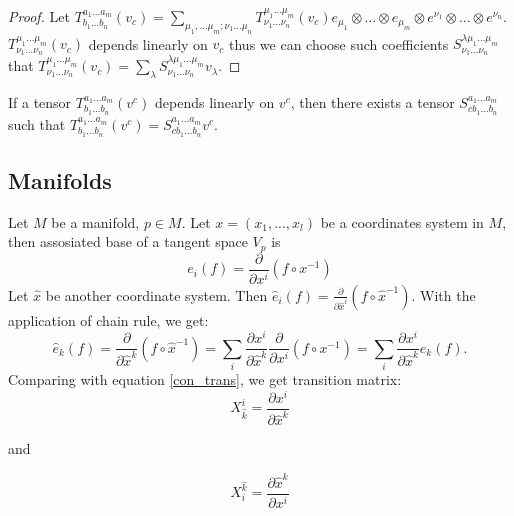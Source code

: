 \documentclass[main.tex]{subfiles}
\begin{document}
\begin{proof}
Let $T^{a_1\dots a_m}_{b_1\dots b_n}(v_c) = \sum\limits_{\mu_1,\dots\mu_m;\nu_1\dots\mu_n} T^{\mu_1\dots\mu_m}_{\nu_1\dots\nu_n}(v_c) e_{\mu_1} \otimes \dots \otimes e_{\mu_m} \otimes e^{\nu_1} \otimes \dots \otimes e^{\nu_n}$. $T^{\mu_1\dots\mu_m}_{\nu_1\dots\nu_n}(v_c)$ depends linearly on $v_c$ thus we can choose such coefficients 
$S^{\lambda \mu_1\dots\mu_m}_{\nu_1\dots\nu_n}$ 
that $T^{\mu_1\dots\mu_m}_{\nu_1\dots\nu_n}(v_c) = \sum_\lambda S^{\lambda \mu_1\dots\mu_m}_{\nu_1\dots\nu_n} v_\lambda$.
\end{proof}

\begin{corollary}
If a tensor $T^{a_1\dots a_m}_{b_1\dots b_n}(v^c)$ depends linearly on $v^c$, then there exists a tensor 
$S^{a_1\dots a_m}_{c b_1\dots b_n}$ such that $T^{a_1\dots a_m}_{b_1\dots b_n}(v^c) = S^{a_1\dots a_m}_{c b_1\dots b_n} v^c.$
\end{corollary} 

\subsection{Manifolds}

Let $M$ be a manifold, $p\in M$. Let $x = (x_1, ..., x_l)$ be a coordinates system in $M$, then assosiated base of a tangent space $V_p$ is 
\begin{equation}
\boxed{e_i(f) = \frac{\partial}{\partial x^i}(f\circ x^{-1})}
\end{equation}
Let $\hat{x}$ be another coordinate system. Then $\hat{e}_i(f) = \frac{\partial}{\partial \hat{x}^i}(f\circ \hat{x}^{-1})$. With the application of chain rule, we get:
\begin{equation}
\hat{e}_k(f) = \frac{\partial}{\partial \hat{x}^k}(f\circ \hat{x}^{-1}) = \sum_i \frac{\partial x^i}{\partial \hat{x}^k}\frac{\partial}{\partial x^i}(f\circ x^{-1}) = \sum_i \frac{\partial x^i}{\partial \hat{x}^k} e_k(f).
\end{equation}
Comparing with equation \ref{con_trans}, we get transition matrix:
\begin{equation}
\boxed{X^i_{\hat{k}} = \frac{\partial x^i}{\partial \hat{x}^k}}
\end{equation}

and

\begin{equation}
\boxed{X^{\hat{k}}_i = \frac{\partial \hat{x}^k}{\partial x^i}}
\end{equation}
\end{document}
